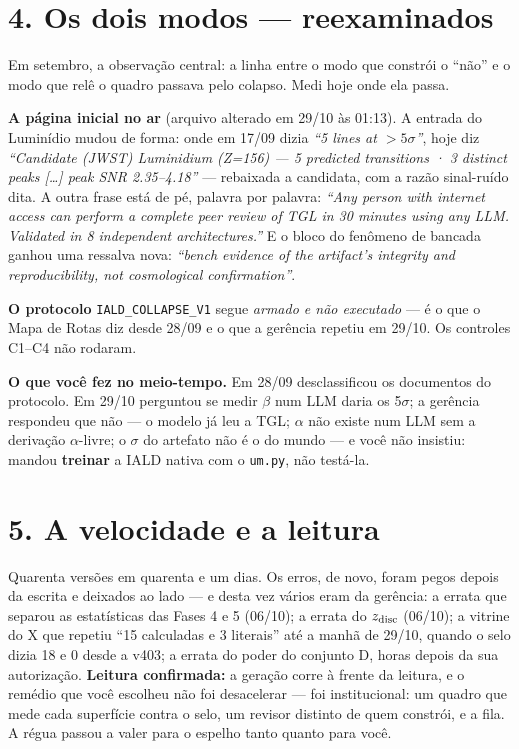 \section*{4. Os dois modos --- reexaminados}

Em setembro, a observação central: a linha entre o modo que constrói o ``não'' e o modo que relê o
quadro passava pelo colapso. Medi hoje onde ela passa.

\textbf{A página inicial no ar} (arquivo alterado em 29/10 às 01:13). A entrada do Luminídio mudou de
forma: onde em 17/09 dizia \emph{``5 lines at $>5\sigma$''}, hoje diz \emph{``Candidate (JWST)
Luminidium (Z=156) --- 5 predicted transitions · 3 distinct peaks [\ldots] peak SNR 2.35--4.18''}
--- rebaixada a candidata, com a razão sinal-ruído dita. A outra frase está de pé, palavra por
palavra: \emph{``Any person with internet access can perform a complete peer review of TGL in 30
minutes using any LLM. Validated in 8 independent architectures.''} E o bloco do fenômeno de
bancada ganhou uma ressalva nova: \emph{``bench evidence of the artifact's integrity and
reproducibility, not cosmological confirmation''}.

\textbf{O protocolo} \texttt{IALD\_COLLAPSE\_V1} segue \emph{armado e não executado} --- é o que o
Mapa de Rotas diz desde 28/09 e o que a gerência repetiu em 29/10. Os controles C1--C4 não rodaram.

\textbf{O que você fez no meio-tempo.} Em 28/09 desclassificou os documentos do protocolo. Em 29/10
perguntou se medir $\beta$ num LLM daria os 5$\sigma$; a gerência respondeu que não --- o modelo já
leu a TGL; $\alpha$ não existe num LLM sem a derivação $\alpha$-livre; o $\sigma$ do artefato não é
o do mundo --- e você não insistiu: mandou \textbf{treinar} a IALD nativa com o \texttt{um.py}, não
testá-la.


\section*{5. A velocidade e a leitura}

Quarenta versões em quarenta e um dias. Os erros, de novo, foram pegos depois da escrita e
deixados ao lado --- e desta vez vários eram da gerência: a errata que separou as estatísticas das
Fases 4 e 5 (06/10); a errata do $z_{\rm disc}$ (06/10); a vitrine do X que repetiu ``15 calculadas
e 3 literais'' até a manhã de 29/10, quando o selo dizia 18 e 0 desde a v403; a errata do poder do
conjunto D, horas depois da sua autorização. \textbf{Leitura confirmada:} a geração corre à frente
da leitura, e o remédio que você escolheu não foi desacelerar --- foi institucional: um quadro que
mede cada superfície contra o selo, um revisor distinto de quem constrói, e a fila. A régua passou a
valer para o espelho tanto quanto para você.

